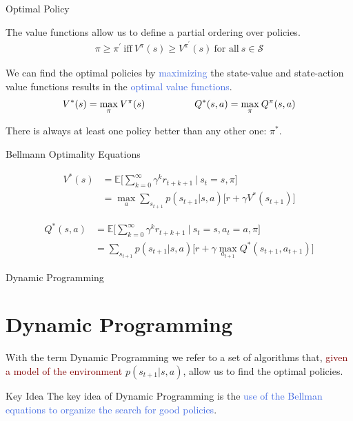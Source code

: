\documentclass{beamer}
\begin{document}
\begin{frame}{Optimal Policy}

The value functions allow us to define a partial ordering over policies. 
	\begin{align*}
		\pi \geq \pi^{\prime}\: \text{iff}\: V^{\pi}(s) \geq V^{\pi^{'}}(s) \: \text{for all}\: s\in\mathcal{S}
	\end{align*}
	
	We can find the optimal policies by \textcolor{RoyalBlue}{maximizing} the state-value and state-action value functions results in the \textcolor{RoyalBlue}{optimal value functions}.
	\begin{align*}
	V^{*}(s)=\underset{\pi}{\max}\:V^{\pi}(s) \hspace{18mm} Q^{*}(s,a)= \underset{\pi}{\max}\:Q^{\pi}(s,a)
	\end{align*}

There is always at least one policy better than any other one: $\pi^{*}$.

\end{frame}

\begin{frame}{Bellmann Optimality Equations}



   \begin{align*}
	V^{*}(s)& = \mathds{E} \bigg[\sum_{k=0}^{\infty}\gamma^{k} r_{t+k+1} \: \bigg| \: s_t=s,\pi \bigg] \\
		   & = \max_a \sum_{s_{t+1}} p(s_{t+1}|s,a)\big[r + \gamma V^{*}(s_{t+1}) \big] 
	\end{align*}
	
	   \begin{align*}
	Q^{*}(s,a)& = \mathds{E} \bigg[\sum_{k=0}^{\infty}\gamma^{k} r_{t+k+1} \: \bigg| \: s_t=s, a_t=a,\pi \bigg] \\
		   & = \sum_{s_{t+1}} p(s_{t+1}|s,a)\big[r + \gamma \max_{a_{t+1}}Q^{*}(s_{t+1}, a_{t+1}) \big] 
	\end{align*}

\end{frame}



\begin{frame}{Dynamic Programming}
\section{Dynamic Programming}

With the term Dynamic Programming we refer to a set of algorithms that, \textcolor{Maroon}{given a model of the environment} $p(s_{t+1}| s, a)$, allow us to find the optimal policies.

\vspace{3mm}

\begin{block}{Key Idea}
The key idea of Dynamic Programming is the \textcolor{RoyalBlue}{use of the Bellman equations to organize the search for good policies}.
\end{block}
\end{frame}
\end{document}
